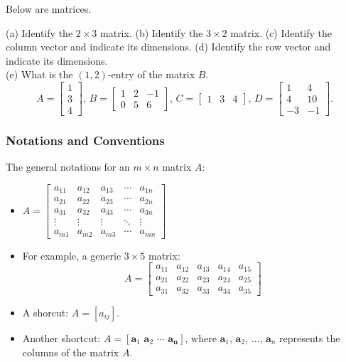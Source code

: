 \documentclass[20pt,a4paper]{extarticle}
\newcounter{example}[section]
\begin{document}
\begin{example}
Below are matrices. 

(a) Identify the $2 \times 3$ matrix. (b) Identify the $3 \times 2$ matrix. (c) Identify the column vector and indicate its dimensions. (d) Identify the row vector and indicate its dimensions. \\ 
(e) What is the $(1, 2)$-entry of the matrix $B$.
\[
	A = \begin{bmatrix} 1 \\ 3 \\ 4 \end{bmatrix} , \, B = \begin{bmatrix} 1 & 2 & -1 \\ 0 & 5 & 6 \end{bmatrix},  \, C = \begin{bmatrix} 1 & 3 & 4 \end{bmatrix},  \, D = \begin{bmatrix} 1 & 4 \\ 4 & 10 \\ -3 & -1 \end{bmatrix} .
\]
\end{example}

\subsubsection*{Notations and Conventions}

The general notations for an $m \times n$ matrix $A$:
\begin{itemize}
	\item $A = \begin{bmatrix} a_{11} & a_{12} & a_{13} & \cdots & a_{1n} \\ 
	a_{21} & a_{22} & a_{23} & \cdots & a_{2n} \\ 
	a_{31} & a_{32} & a_{33} & \cdots & a_{3n} \\ 
	\vdots & \vdots & \vdots & \ddots & \vdots \\ 
	a_{m1} & a_{m2} & a_{m3} & \cdots & a_{mn} \end{bmatrix}$
	\item For example, a generic $3 \times 5$ matrix:
		\[
			A = \begin{bmatrix} 
			a_{11} & a_{12} & a_{13} & a_{14} & a_{15} \\ 
			a_{21} & a_{22} & a_{23} & a_{24} & a_{25} \\ 
			a_{31} & a_{32} & a_{33} & a_{34} & a_{35} 
			\end{bmatrix}
		\]
	\item A shorcut: $A = [a_{ij}]$.
	\item Another shortcut: $A = [ \mathbf{a}_1 \, \, \mathbf{a}_2 \, \, \cdots \, \, \mathbf{a_n}]$, where $\mathbf{a}_1$, $\mathbf{a}_2$, $\ldots$, $\mathbf{a}_n$ represents the columns of the matrix $A$. 
\end{itemize}
\end{document}
